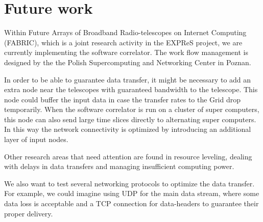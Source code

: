 \section{Future work}\label{sec:conclusion}

Within Future Arrays of Broadband Radio-telescopes on Internet
Computing (FABRIC), which is a joint research activity in the EXPReS
project, we are currently implementing the software correlator. The
work flow management is designed by the the Polish Supercomputing and
Networking Center in Poznan.

In order to be able to guarantee data transfer, it might be necessary
to add an extra node near the telescopes with guaranteed bandwidth to
the telescope. This node could buffer the input data in case the
transfer rates to the Grid drop temporarily. When the software
correlator is run on a cluster of super computers, this node can also
send large time slices directly to alternating super computers. In
this way the network connectivity is optimized by introducing an
additional layer of input nodes.

Other research areas that need attention are found in resource
leveling, dealing with delays in data transfers and managing
insufficient computing power.

We also want to test several networking protocols to optimize the data
transfer. For example, we could imagine using UDP for the main data
stream, where some data loss is acceptable and a TCP connection for
data-headers to guarantee their proper delivery.

